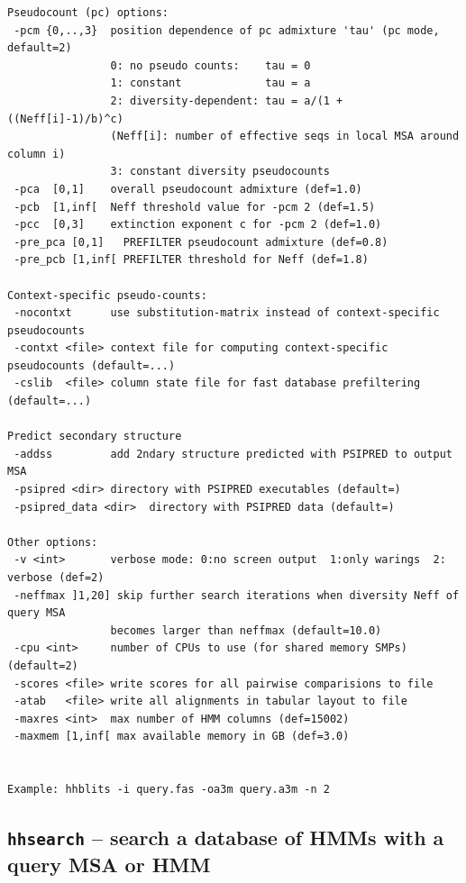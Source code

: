 \documentclass[11pt,a4paper]{article}
\begin{document}
\begin{verbatim}
Pseudocount (pc) options:                                                        
 -pcm {0,..,3}  position dependence of pc admixture 'tau' (pc mode, default=2) 
                0: no pseudo counts:    tau = 0                                  
                1: constant             tau = a                                  
                2: diversity-dependent: tau = a/(1 + ((Neff[i]-1)/b)^c)          
                (Neff[i]: number of effective seqs in local MSA around column i) 
                3: constant diversity pseudocounts                               
 -pca  [0,1]    overall pseudocount admixture (def=1.0)                        
 -pcb  [1,inf[  Neff threshold value for -pcm 2 (def=1.5)                      
 -pcc  [0,3]    extinction exponent c for -pcm 2 (def=1.0)                     
 -pre_pca [0,1]   PREFILTER pseudocount admixture (def=0.8)                    
 -pre_pcb [1,inf[ PREFILTER threshold for Neff (def=1.8)                       

Context-specific pseudo-counts:                                                  
 -nocontxt      use substitution-matrix instead of context-specific pseudocounts 
 -contxt <file> context file for computing context-specific pseudocounts (default=...)
 -cslib  <file> column state file for fast database prefiltering (default=...)

Predict secondary structure
 -addss         add 2ndary structure predicted with PSIPRED to output MSA 
 -psipred <dir> directory with PSIPRED executables (default=)  
 -psipred_data <dir>  directory with PSIPRED data (default=) 

Other options:                                                                   
 -v <int>       verbose mode: 0:no screen output  1:only warings  2: verbose (def=2)
 -neffmax ]1,20] skip further search iterations when diversity Neff of query MSA 
                becomes larger than neffmax (default=10.0)
 -cpu <int>     number of CPUs to use (for shared memory SMPs) (default=2)      
 -scores <file> write scores for all pairwise comparisions to file               
 -atab   <file> write all alignments in tabular layout to file                   
 -maxres <int>  max number of HMM columns (def=15002)             
 -maxmem [1,inf[ max available memory in GB (def=3.0)          


Example: hhblits -i query.fas -oa3m query.a3m -n 2  
\end{verbatim} 
\normalsize


\subsection{{\tt hhsearch} -- search a database of HMMs with a query MSA or HMM}
\end{document}
